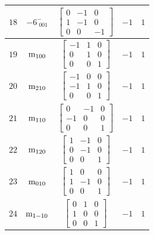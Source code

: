 \documentclass[fleqn,8pt]{jsarticle}
\begin{document}
\begin{longtable}{ccccc}
$ 18 $ & $ -6^{-}_{\,\,001} $ & $ \begin{bmatrix} 0 & -1 & 0 \\ 1 & -1 & 0 \\ 0 & 0 & -1 \end{bmatrix} $ & $ -1 $ & $ 1 $ \\ \hline
$ 19 $ & $ {\rm m}_{100} $ & $ \begin{bmatrix} -1 & 1 & 0 \\ 0 & 1 & 0 \\ 0 & 0 & 1 \end{bmatrix} $ & $ -1 $ & $ 1 $ \\ \hline
$ 20 $ & $ {\rm m}_{210} $ & $ \begin{bmatrix} -1 & 0 & 0 \\ -1 & 1 & 0 \\ 0 & 0 & 1 \end{bmatrix} $ & $ -1 $ & $ 1 $ \\ \hline
$ 21 $ & $ {\rm m}_{110} $ & $ \begin{bmatrix} 0 & -1 & 0 \\ -1 & 0 & 0 \\ 0 & 0 & 1 \end{bmatrix} $ & $ -1 $ & $ 1 $ \\ \hline
$ 22 $ & $ {\rm m}_{120} $ & $ \begin{bmatrix} 1 & -1 & 0 \\ 0 & -1 & 0 \\ 0 & 0 & 1 \end{bmatrix} $ & $ -1 $ & $ 1 $ \\ \hline
$ 23 $ & $ {\rm m}_{010} $ & $ \begin{bmatrix} 1 & 0 & 0 \\ 1 & -1 & 0 \\ 0 & 0 & 1 \end{bmatrix} $ & $ -1 $ & $ 1 $ \\ \hline
$ 24 $ & $ {\rm m}_{1-10} $ & $ \begin{bmatrix} 0 & 1 & 0 \\ 1 & 0 & 0 \\ 0 & 0 & 1 \end{bmatrix} $ & $ -1 $ & $ 1 $ \\
\end{longtable}
\end{document}
